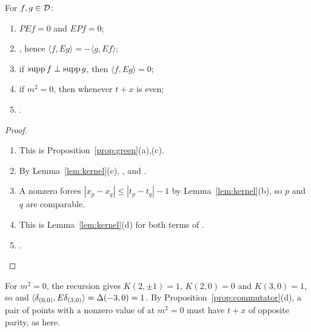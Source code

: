 \begin{proposition}\label{prop:commutator}
For $f,g\in\mathcal D$:
\begin{enumerate}[label=(\alph*),leftmargin=2.5em]
\item $PEf=0$ and $EPf=0$;
\item {}, hence $\langle f,Eg\rangle=-\langle g,Ef\rangle$;
\item if $\operatorname{supp} f\perp\operatorname{supp} g$, then $\langle f,Eg\rangle=0$;
\item if $m^2=0$, then  whenever $t+x$ is even;
\item {}.
\end{enumerate}
\end{proposition}
\begin{proof}
\begin{enumerate}[leftmargin=2.5em]
\item[(a)] This is Proposition~\ref{prop:green}(a),(c).
\item[(b)] By Lemma~\ref{lem:kernel}(c), , and
.
\item[(c)] A nonzero  forces $|x_p-x_q|\leq|t_p-t_q|-1$ by Lemma~\ref{lem:kernel}(b),
so $p$ and $q$ are comparable.
\item[(d)] This is Lemma~\ref{lem:kernel}(d) for both terms of \rev{$\Delta$}.
\item[(e)] .
\end{enumerate}
\end{proof}

\noindent{}

\begin{example}\label{ex:lattice-witness}
For $m^2=0$, the recursion gives $K(2,\pm1)=1$, $K(2,0)=0$ and $K(3,0)=1$, so  and
$\langle\delta_{(0,0)},E\delta_{(3,0)}\rangle=\Delta(-3,0)=1$. By
Proposition~\ref{prop:commutator}(d), a pair of points with a nonzero value of \rev{$\Delta$} at $m^2=0$
must have $t+x$ of opposite parity, as here.
\end{example}

